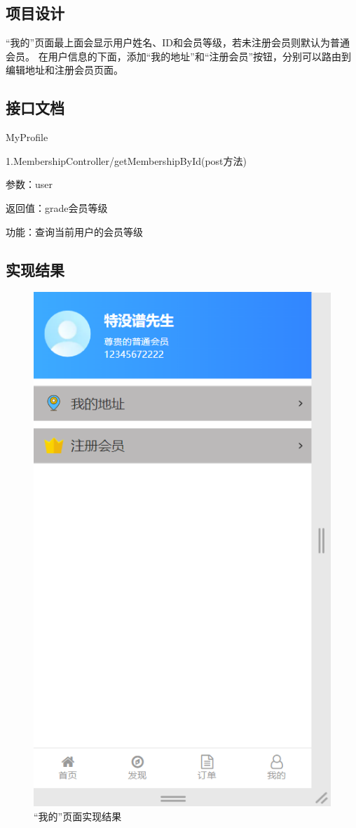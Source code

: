 \subsection{项目设计}
“我的”页面最上面会显示用户姓名、ID和会员等级，若未注册会员则默认为普通会员。
在用户信息的下面，添加“我的地址”和“注册会员”按钮，分别可以路由到编辑地址和注册会员页面。

\subsection*{接口文档}
MyProfile

1.MembershipController/getMembershipById(post方法)

参数：user

返回值：grade会员等级

功能：查询当前用户的会员等级

\subsection{实现结果}
\begin{figure}[H]
    \centering
    \includegraphics[scale=0.5]{figures/5.1.3.png}
    \caption{“我的”页面实现结果}
\end{figure}


